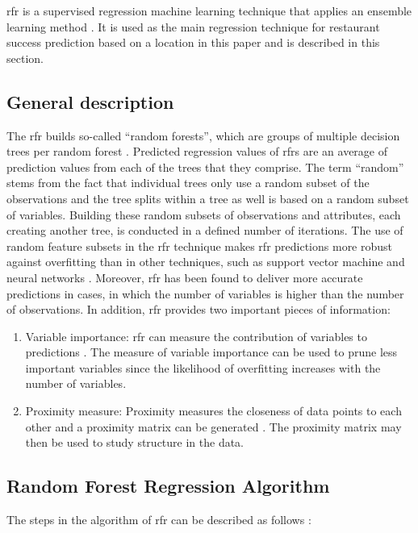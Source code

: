 \documentclass[a4paper, 11pt, oneside]{Thesis}  %
\begin{document}
\ac{rfr} is a supervised regression machine learning technique that applies an ensemble learning method \cite{Gromping.2009}. It is used as the main regression technique for restaurant success prediction based on a location in this paper and is described in this section.

\subsection{General description}

The \ac{rfr} builds so-called “random forests”, which are groups of multiple decision trees per random forest \cite{Gromping.2009}. Predicted regression values of \ac{rfr}s are an average of prediction values from each of the trees that they comprise. The term “random” stems from the fact that individual trees only use a random subset of the observations and the tree splits within a tree as well is based on a random subset of variables. Building these random subsets of observations and attributes, each creating another tree, is conducted in a defined number of iterations. The use of random feature subsets in the \ac{rfr} technique makes \ac{rfr} predictions more robust against overfitting than in other techniques, such as support vector machine and neural networks \cite{Liaw.2002}. Moreover, \ac{rfr} has been found to deliver more accurate predictions in cases, in which the number of variables is higher than the number of observations. In addition, \ac{rfr} provides two important pieces of information:

\begin{enumerate}
\item	 Variable importance: \ac{rfr} can measure the contribution of variables to predictions \cite{Liaw.2002}. The measure of variable importance can be used to prune less important variables since the likelihood of overfitting increases with the number of variables.
\item Proximity measure: Proximity measures the closeness of data points to each other and a proximity matrix can be generated \cite{Liaw.2002}. The proximity matrix may then be used to study structure in the data.
\end{enumerate}

\subsection{Random Forest Regression Algorithm}

The steps in the algorithm of \ac{rfr} can be described as follows \cite{Liaw.2002}:
\end{document}
